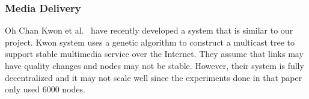 \subsubsection{Media Delivery}

Oh Chan Kwon et al.~\cite{51043858} have recently developed a system that is similar to our project. Kwon system uses a genetic algorithm to construct a multicast tree to support stable multimedia service over the Internet. They assume that links may have quality changes and nodes may not be stable. However, their system is fully decentralized and it may not scale well
since the experiments done in that paper only used 6000 nodes.
